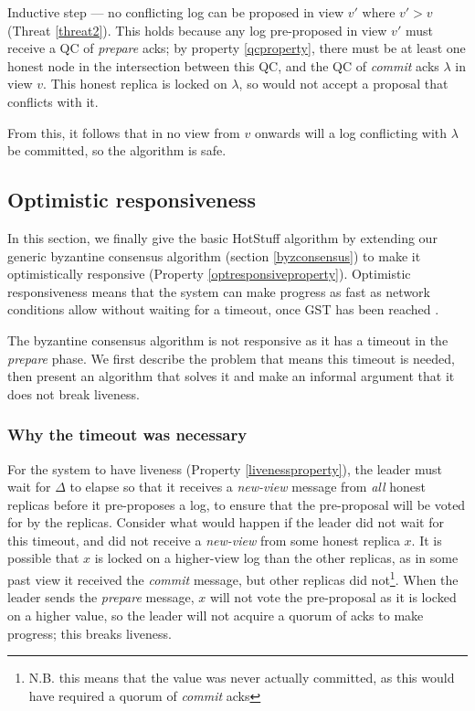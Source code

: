 Inductive step --- no conflicting log can be proposed in view $v'$ where $v' > v$ (Threat \ref{threat2}). This holds because any log pre-proposed in view $v'$ must receive a QC of \textit{prepare} acks; by property \ref{qcproperty}, there must be at least one honest node in the intersection between this QC, and the QC of \textit{commit} acks $\lambda$ in view $v$. This honest replica is locked on $\lambda$, so would not accept a proposal that conflicts with it.

From this, it follows that in no view from $v$ onwards will a log conflicting with $\lambda$ be committed, so the algorithm is safe.

\subsection{Optimistic responsiveness} \label{optresponsive}
In this section, we finally give the basic HotStuff algorithm by extending our generic byzantine consensus algorithm (section \ref{byzconsensus}) to make it optimistically responsive (Property \ref{optresponsiveproperty}). Optimistic responsiveness means that the system can make progress as fast as network conditions allow without waiting for a timeout, once GST has been reached \cite{passThunderellaBlockchainsOptimistic2018}.

The byzantine consensus algorithm is not responsive as it has a timeout in the \textit{prepare} phase. We first describe the problem that means this timeout is needed, then present an algorithm that solves it and make an informal argument that it does not break liveness.

\subsubsection{Why the timeout was necessary}
For the system to have liveness (Property \ref{livenessproperty}), the leader must wait for $\Delta$ to elapse so that it receives a \textit{new-view} message from \textit{all} honest replicas before it pre-proposes a log, to ensure that the pre-proposal will be voted for by the replicas. Consider what would happen if the leader did not wait for this timeout, and did not receive a \textit{new-view} from some honest replica $x$. It is possible that $x$ is locked on a higher-view log than the other replicas, as in some past view it received the \textit{commit} message, but other replicas did not\footnote{N.B. this means that the value was never actually committed, as this would have required a quorum of \textit{commit} acks}. When the leader sends the \textit{prepare} message, $x$ will not vote the pre-proposal as it is locked on a higher value, so the leader will not acquire a quorum of acks to make progress; this breaks liveness.

